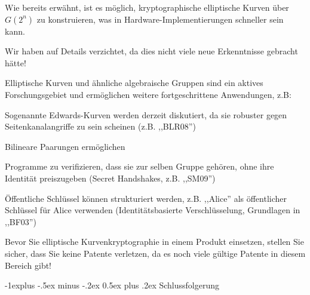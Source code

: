 \documentclass[a4paper]{article}
\makeatletter
\renewcommand{\subsection}{\@startsection{subsection}{2}{0mm}%
 {-1explus -.5ex minus -.2ex}%
 {0.5ex plus .2ex}%
 {\normalfont\normalsize\bfseries}}
\makeatother
\begin{document}
\begin{multicols}{3}
      \begin{itemize*}
            \item Wie bereits erwähnt, ist es möglich, kryptographische elliptische
            Kurven über $G(2^n)$ zu konstruieren, was in
            Hardware-Implementierungen schneller sein kann.
            \begin{itemize*}
                  \item Wir haben auf Details verzichtet, da dies nicht viele neue Erkenntnisse gebracht hätte!
            \end{itemize*}
            \item Elliptische Kurven und ähnliche algebraische Gruppen sind ein aktives
            Forschungsgebiet und ermöglichen weitere fortgeschrittene Anwendungen,
            z.B:
            \begin{itemize*}
                  \item Sogenannte Edwards-Kurven werden derzeit diskutiert, da sie robuster gegen Seitenkanalangriffe zu sein scheinen (z.B. ,,BLR08'')
                  \item Bilineare Paarungen ermöglichen
                  \begin{itemize*} \item Programme zu verifizieren, dass sie zur selben Gruppe gehören, ohne ihre Identität preiszugeben (Secret Handshakes, z.B. ,,SM09'') \item Öffentliche Schlüssel können strukturiert werden, z.B. ,,Alice'' als öffentlicher Schlüssel für Alice verwenden (Identitätsbasierte Verschlüsselung, Grundlagen in ,,BF03'') \end{itemize*}
            \end{itemize*}
            \item Bevor Sie elliptische Kurvenkryptographie in einem Produkt einsetzen,
            stellen Sie sicher, dass Sie keine Patente verletzen, da es noch viele
            gültige Patente in diesem Bereich gibt!
      \end{itemize*}


      \subsection{Schlussfolgerung}


\end{multicols}
\end{document}
